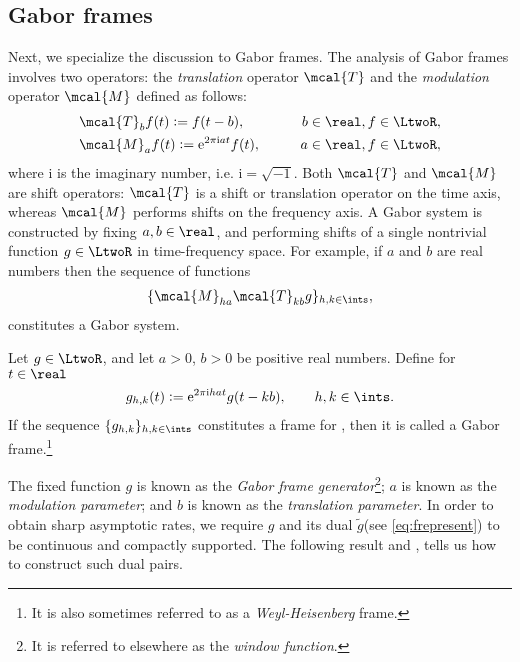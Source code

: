 \documentclass[a4paper, 12pt,preprint]{article}
\renewcommand{\i}{\mathrm{i}}
\newcommand{\tg}{\ensuremath{\tilde{g}}\xspace}
\begin{document}
\subsection{ Gabor frames}
Next, we specialize the discussion to Gabor frames. The analysis of Gabor frames involves two operators: the \emph{translation} operator  $\mcal{T}$ and  the \emph{modulation} operator $\mcal{M}$ defined as follows: 
\begin{align}
  & \mcal{T}_bf(t) := f(t -  b), &\qquad b \in \real, f \in \LtwoR, \label{eq:translation}\\
  & \mcal{M}_af(t) := \mathrm{e}^{2\pi \i at}f(t), &\qquad a \in \real, f \in \LtwoR,\label{eq:modulation} 
\end{align}
where $\i$ is the imaginary number, i.e.  $\i = \sqrt{-1}$.  Both $\mcal{T}$ and $\mcal{M}$ are shift operators: $\mcal{T}$ is a shift or translation operator on the time axis, whereas $\mcal{M}$ performs shifts on the frequency axis. A Gabor system is constructed by fixing $a, b \in \real$, and  performing shifts of a single nontrivial  function $g \in \LtwoR$  in time-frequency space. For example,  if $a$ and $b$ are real numbers then the sequence of functions  
\begin{align}
  \{\mcal{M}_{ha} \mcal{T}_{kb} g\}_{h,k \in \ints},\notag
  \label{}
\end{align}
constitutes  a Gabor system. 
\begin{defn}\label{defn:def}
  Let $g \in \LtwoR$, and let  $a > 0$, $b > 0$ be  positive real numbers. Define for $t \in \real$    
\begin{align}
  g_{h,k}(t) := \mathrm{e}^{2 \pi \i h a t }g(t - k b), \qquad   h,k \in \ints. \notag    
 \end{align}
 If the sequence $\{g_{h,k}\}_{h,k \in \ints}$ constitutes a  frame for \LtwoR, then it is called a Gabor frame.\footnote{It is also sometimes referred to as a \emph{Weyl-Heisenberg} frame.} 
\end{defn}
\noindent The fixed function $g$ is known as  the \emph{Gabor frame generator}\footnote{It is  referred to elsewhere as the \emph{window function}.}; $a$ is known as the \emph{modulation parameter}; and $b$ is known as the \emph{translation parameter}.   
In order to obtain sharp asymptotic rates, we require $g$ and its dual \tg (see \eqref{eq:frepresent}) to be continuous and compactly supported. The following result \citep[Lemma 1.2]{Christensen2006} and   \citep[Proposition 2.4]{Zhang2008}, tells us how to construct such dual pairs.
\end{document}
